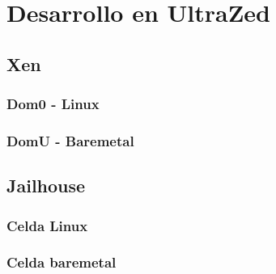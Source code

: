 \chapter{Desarrollo en UltraZed}

\section{Xen}
\subsection{Dom0 - Linux}

\subsection{DomU - Baremetal}

\section{Jailhouse}
\subsection{Celda Linux}

\subsection{Celda baremetal}

